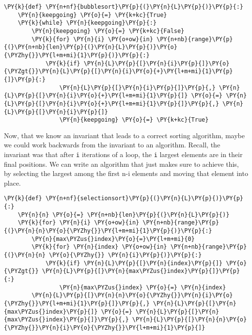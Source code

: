 \begin{Verbatim}[commandchars=\\\{\}]
\PY{k}{def} \PY{n+nf}{bubblesort}\PY{p}{(}\PY{n}{L}\PY{p}{)}\PY{p}{:}
    \PY{n}{keepgoing} \PY{o}{=} \PY{k+kc}{True}
    \PY{k}{while} \PY{n}{keepgoing}\PY{p}{:}
        \PY{n}{keepgoing} \PY{o}{=} \PY{k+kc}{False}
        \PY{k}{for} \PY{n}{i} \PY{o+ow}{in} \PY{n+nb}{range}\PY{p}{(}\PY{n+nb}{len}\PY{p}{(}\PY{n}{L}\PY{p}{)}\PY{o}{\PYZhy{}}\PY{l+m+mi}{1}\PY{p}{)}\PY{p}{:}
            \PY{k}{if} \PY{n}{L}\PY{p}{[}\PY{n}{i}\PY{p}{]}\PY{o}{\PYZgt{}}\PY{n}{L}\PY{p}{[}\PY{n}{i}\PY{o}{+}\PY{l+m+mi}{1}\PY{p}{]}\PY{p}{:}
                \PY{n}{L}\PY{p}{[}\PY{n}{i}\PY{p}{]}\PY{p}{,} \PY{n}{L}\PY{p}{[}\PY{n}{i}\PY{o}{+}\PY{l+m+mi}{1}\PY{p}{]} \PY{o}{=} \PY{n}{L}\PY{p}{[}\PY{n}{i}\PY{o}{+}\PY{l+m+mi}{1}\PY{p}{]}\PY{p}{,} \PY{n}{L}\PY{p}{[}\PY{n}{i}\PY{p}{]}
                \PY{n}{keepgoing} \PY{o}{=} \PY{k+kc}{True}
\end{Verbatim}



Now, that we know an invariant that leads to a correct sorting algorithm, maybe we could work backwards from the invariant to an algorithm.  Recall, the invariant was that after \texttt{i} iterations of a loop, the \texttt{i} largest elements are in their final positions.  We can write an algorithm that just makes sure to achieve this, by selecting the largest among the first n-i elements and moving that element into place.

\begin{Verbatim}[commandchars=\\\{\}]
\PY{k}{def} \PY{n+nf}{selectionsort}\PY{p}{(}\PY{n}{L}\PY{p}{)}\PY{p}{:}
    \PY{n}{n} \PY{o}{=} \PY{n+nb}{len}\PY{p}{(}\PY{n}{L}\PY{p}{)}
    \PY{k}{for} \PY{n}{i} \PY{o+ow}{in} \PY{n+nb}{range}\PY{p}{(}\PY{n}{n}\PY{o}{\PYZhy{}}\PY{l+m+mi}{1}\PY{p}{)}\PY{p}{:}
        \PY{n}{max\PYZus{}index}\PY{o}{=}\PY{l+m+mi}{0}        
        \PY{k}{for} \PY{n}{index} \PY{o+ow}{in} \PY{n+nb}{range}\PY{p}{(}\PY{n}{n} \PY{o}{\PYZhy{}} \PY{n}{i}\PY{p}{)}\PY{p}{:}
            \PY{k}{if} \PY{n}{L}\PY{p}{[}\PY{n}{index}\PY{p}{]} \PY{o}{\PYZgt{}} \PY{n}{L}\PY{p}{[}\PY{n}{max\PYZus{}index}\PY{p}{]}\PY{p}{:}
                \PY{n}{max\PYZus{}index} \PY{o}{=} \PY{n}{index}
        \PY{n}{L}\PY{p}{[}\PY{n}{n}\PY{o}{\PYZhy{}}\PY{n}{i}\PY{o}{\PYZhy{}}\PY{l+m+mi}{1}\PY{p}{]}\PY{p}{,} \PY{n}{L}\PY{p}{[}\PY{n}{max\PYZus{}index}\PY{p}{]} \PY{o}{=} \PY{n}{L}\PY{p}{[}\PY{n}{max\PYZus{}index}\PY{p}{]}\PY{p}{,} \PY{n}{L}\PY{p}{[}\PY{n}{n}\PY{o}{\PYZhy{}}\PY{n}{i}\PY{o}{\PYZhy{}}\PY{l+m+mi}{1}\PY{p}{]}
\end{Verbatim}



